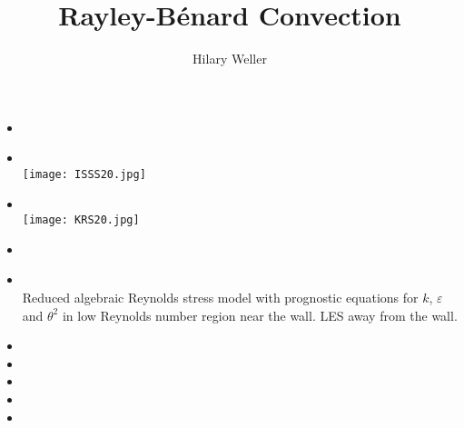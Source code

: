 \documentclass[12pt,british,12pt, round,comma,sort&compress]{article}
\begin{document}
\title{Rayley-B\'{e}nard Convection}
\author{Hilary Weller}
\maketitle

\begin{itemize}

\item {}

\item {} \ \\
\texttt{[image: ISSS20.jpg]}

\item {} \ \\
\texttt{[image: KRS20.jpg]}

\item {} \ \\

\item {} \ \\
Reduced algebraic Reynolds stress model with prognostic equations for $k$, $\varepsilon$ and $\theta^2$ in low Reynolds number region near the wall. LES away from the wall.\\


\item {}
\item {}
\item {}
\item {}
\item {}


\end{itemize}

\end{document}
